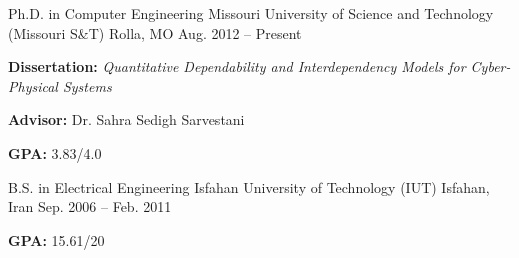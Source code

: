 \begin{cventries}
  \cventry
    {Ph.D. in Computer Engineering}
    {Missouri University of Science and Technology (Missouri S\&T)}
    {Rolla, MO}
    {Aug. 2012 -- Present}
    {
      \begin{cvitems}
        \item \textbf{Dissertation:} \emph{Quantitative Dependability and Interdependency Models for Cyber-Physical Systems}
        \item \textbf{Advisor:} Dr. Sahra Sedigh Sarvestani
        \item \textbf{GPA:} 3.83/4.0
      \end{cvitems}
    }
  \cventry
    {B.S. in Electrical Engineering}
    {Isfahan University of Technology (IUT)}
    {Isfahan, Iran}
    {Sep. 2006 -- Feb. 2011}
    {
      \begin{cvitems}
        \item \textbf{GPA:} 15.61/20
      \end{cvitems}
    }
\end{cventries} 